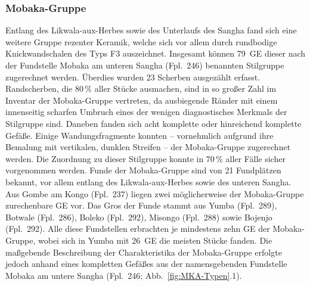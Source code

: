 \subsubsection{Mobaka-Gruppe}\label{sec:MKA-Gr}

Entlang des \mbox{Likwala}-\mbox{aux}-\mbox{Herbes} sowie des Unterlaufs des \mbox{Sangha} fand sich eine weitere Gruppe rezenter Keramik, welche sich vor allem durch rundbodige Knickwandschalen des Typs F3 auszeichnet. Insgesamt können 79~GE dieser nach der Fundstelle Mobaka am unteren \mbox{Sangha} (Fpl.~246) benannten Stilgruppe zugerechnet werden. Überdies wurden 23 Scherben ausgezählt erfasst. Randscherben, die 80\,\% aller Stücke ausmachen, sind in so großer Zahl im Inventar der Mobaka-Gruppe vertreten, da ausbiegende Ränder mit einem innenseitig scharfen Umbruch eines der wenigen diagnostisches Merkmals der Stilgruppe sind. Daneben fanden sich acht komplette oder hinreichend komplette Gefäße. Einige Wandungsfragmente konnten -- vornehmlich aufgrund ihre Bemalung mit vertikalen, dunklen Streifen -- der Mobaka-Gruppe zugerechnet werden. Die Zuordnung zu dieser Stilgruppe konnte in 70\,\% aller Fälle sicher vorgenommen werden. Funde der Mobaka-Gruppe sind von 21 Fundplätzen bekannt, vor allem entlang des \mbox{Likwala}-\mbox{aux}-\mbox{Herbes} sowie des unteren \mbox{Sangha}. Aus Gombe am Kongo (Fpl.~237) liegen zwei möglicherweise der Mobaka-Gruppe zurechenbare GE vor. Das Gros der Funde stammt aus Yumba (Fpl.~289), Botwale (Fpl.~286), Boleko (Fpl.~292), Misongo (Fpl.~288) sowie Bojenjo (Fpl.~292). Alle diese Fundstellen erbrachten je mindestens zehn GE der Mobaka-Gruppe, wobei sich in Yumba mit 26~GE die meisten Stücke fanden. Die maßgebende Beschreibung der Charakteristika der Mobaka-Gruppe erfolgte jedoch anhand eines kompletten Gefäßes aus der namensgebenden Fundstelle Mobaka am untere \mbox{Sangha} (Fpl.~246; Abb.~\ref{fig:MKA-Typen}.1).


